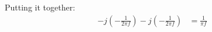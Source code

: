 \documentclass{article}
\begin{document}
\begin{enumerate}[label=6.\arabic*]
    Putting it together:
    \begin{align*}
        -j \left(-\frac{1}{2\pi f}\right) - j \left(-\frac{1}{2\pi f}\right) &= \frac{1}{\pi f}
    \end{align*}

\end{enumerate}

\end{document}

